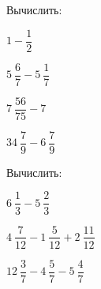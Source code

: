 \begin{listofex}
\begin{enumcols}[itemcolumns=2]
	\end{enumcols}
	\item Вычислить:
	\begin{enumcols}[itemcolumns=4]
		\item \( 1-\dfrac{1}{2} \)
		\item \( 5\:\dfrac{6}{7}-5\:\dfrac{1}{7} \)
		\item \( 7\:\dfrac{56}{75}-7 \)
		\item \( 34\:\dfrac{7}{9}-6\:\dfrac{7}{9} \)
	\end{enumcols}
	\item Вычислить:
	\begin{enumcols}[itemcolumns=3]
		\item \( 6\:\dfrac{1}{3}-5\:\dfrac{2}{3} \)
		\item \( 4\:\dfrac{7}{12}-1\:\dfrac{5}{12}+2\:\dfrac{11}{12} \)
		\item \( 12\:\dfrac{3}{7}-4\:\dfrac{5}{7}-5\:\dfrac{4}{7} \)
	\end{enumcols}
\end{listofex}
%	
%	
%	
%	
%	
%	
%	
%	
%	

